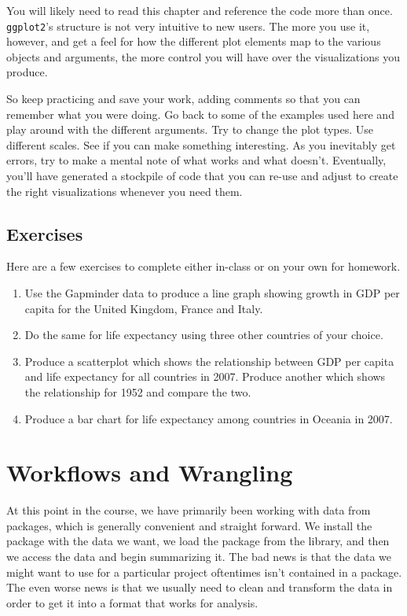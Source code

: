 \documentclass[
  letterpaper,
]{book}
\begin{document}
You will likely need to read this chapter and reference the code more
than once. \texttt{ggplot2}'s structure is not very intuitive to new
users. The more you use it, however, and get a feel for how the
different plot elements map to the various objects and arguments, the
more control you will have over the visualizations you produce.

So keep practicing and save your work, adding comments so that you can
remember what you were doing. Go back to some of the examples used here
and play around with the different arguments. Try to change the plot
types. Use different scales. See if you can make something interesting.
As you inevitably get errors, try to make a mental note of what works
and what doesn't. Eventually, you'll have generated a stockpile of code
that you can re-use and adjust to create the right visualizations
whenever you need them.

\hypertarget{exercises}{%
\section{Exercises}\label{exercises}}

Here are a few exercises to complete either in-class or on your own for
homework.

\begin{enumerate}
\def\labelenumi{\arabic{enumi}.}
\item
  Use the Gapminder data to produce a line graph showing growth in GDP
  per capita for the United Kingdom, France and Italy.
\item
  Do the same for life expectancy using three other countries of your
  choice.
\item
  Produce a scatterplot which shows the relationship between GDP per
  capita and life expectancy for all countries in 2007. Produce another
  which shows the relationship for 1952 and compare the two.
\item
  Produce a bar chart for life expectancy among countries in Oceania in
  2007.
\end{enumerate}


\hypertarget{workflows-and-wrangling}{%
\chapter{Workflows and Wrangling}\label{workflows-and-wrangling}}

At this point in the course, we have primarily been working with data
from packages, which is generally convenient and straight forward. We
install the package with the data we want, we load the package from the
library, and then we access the data and begin summarizing it. The bad
news is that the data we might want to use for a particular project
oftentimes isn't contained in a package. The even worse news is that we
usually need to clean and transform the data in order to get it into a
format that works for analysis.
\end{document}
